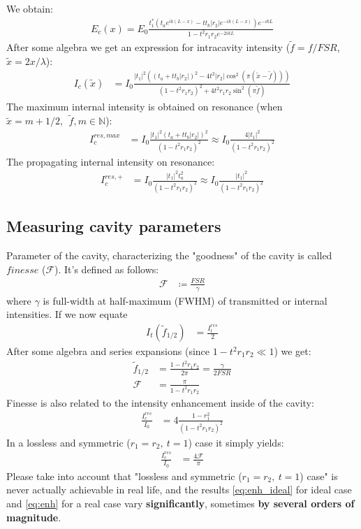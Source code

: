 \documentclass{article}
\numberwithin{equation}{section}
\begin{document}
We obtain:
\begin{align}
    E_c(x) = E_0  \frac{t_1^* (t_a e^{ik(L-x)} - t t_b |r_2| e^{-ik(L-x)})e^{-ikL}}{1-t^2 r_1 r_2 e^{-2ikL}}
\end{align}
After some algebra we get an expression for intracavity intensity ($\tilde{f} = f / FSR$, $\tilde{x} = 2 x / \lambda$):
\begin{align}
    I_c(\tilde{x}) &= I_0 \frac{|t_1|^2((t_a + t t_b |r_2|)^2 - 4 t^2 |r_2| \cos^2 (\pi (\tilde{x} -  \tilde{f})))}{(1-t^2 r_1 r_2)^2 + 4 t^2 r_1 r_2 \sin^2 (\pi \tilde{f})}
\end{align}
The maximum internal intensity is obtained on resonance (when $\tilde{x} = m+1/2, ~~ \tilde{f}, m \in \mathbb{N}$):
\begin{align}
    I_c^{{res, max}} &= I_0 \frac{|t_1|^2 (t_a + t t_b |r_2|)^2}{(1 - t^2 r_1 r_2)^2} \approx I_0 \frac{4 |t_1|^2}{(1 - t^2 r_1 r_2)^2}
\end{align}
The propagating internal intensity on resonance:
\begin{align}
        I_c^{{res, +}} &= I_0 \frac{|t_1|^2 t_a^2}{(1 - t^2 r_1 r_2)^2} \approx I_0 \frac{|t_1|^2}{(1 - t^2 r_1 r_2)^2}
\end{align}

\subsection{Measuring cavity parameters}
Parameter of the cavity, characterizing the "goodness" of the cavity is called $\textit{finesse}$ ($\mathcal{F}$). It's defined as follows:
\begin{align}
    \mathcal{F} &\coloneqq \frac{FSR}{\gamma}
\end{align}
where $\gamma$ is full-width at half-maximum (FWHM) of transmitted or internal intensities. 
If we now equate 
\begin{align}
    I_t(\tilde{f}_{1/2}) &= \frac{I_t^{res}}{2} 
\end{align}
After some algebra and series expansions (since $1-t^2 r_1 r_2 \ll 1$) we get:
\begin{align}
    \tilde{f}_{1/2} &= \frac{1-t^2 r_1 r_2}{2 \pi} = \frac{\gamma}{2 FSR}\\
    \mathcal{F} &= \frac{\pi}{1-t^2 r_1 r_2}
\end{align}
Finesse is also related to the intensity enhancement inside of the cavity:
\begin{align}
    \frac{I_c^{res}}{I_0} &= 4 \frac{1-r_1^2}{(1-t^2 r_1 r_2)^2} \label{eq:enh}
\end{align}
In a lossless and symmetric ($r_1 = r_2,~t=1$) case it simply yields:
\begin{align}
    \frac{I_c^{res}}{I_0} &= \frac{4 \mathcal{F}}{\pi} \label{eq:enh_ideal}
\end{align}
Please take into account that "lossless and symmetric ($r_1 = r_2,~t=1$) case" is never actually achievable in real life, and the results \ref{eq:enh_ideal} for ideal case and \ref{eq:enh} for a real case vary \textbf{significantly}, sometimes \textbf{by several orders of magnitude}.
\end{document}
